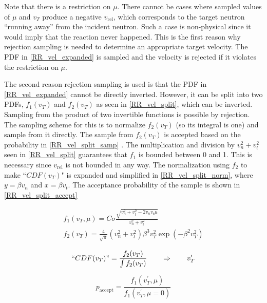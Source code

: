 Note that there is a restriction on $\mu$.  There cannot be cases where sampled values of $\mu$ and $v_T$ produce a negative $v_\mathrm{rel}$, which corresponds to the target neutron ``running away'' from the incident neutron.  Such a case is non-physical since it would imply that the reaction never happened.  This is the first reason why rejection sampling is needed to determine an appropriate target velocity.  The PDF in \eqref{RR_vel_expanded} is sampled and the velocity is rejected if it violates the restriction on $\mu$. %

The second reason rejection sampling is used is that the PDF in \eqref{RR_vel_expanded} cannot be directly inverted.  However, it can be split into two PDFs, $f_1(v_T)$ and $f_2(v_T)$ as seen in \eqref{RR_vel_split}, which can be inverted.  Sampling from the product of two invertible functions is possible by rejection.  The sampling scheme for this is to normalize $f_2(v_T)$ (so its integral is one) and sample from it directly.  The sample from $f_2(v_T)$ is accepted based on the probability in \eqref{RR_vel_split_samp} \cite{openmc}.
The multiplication and division by $v_n^2+v_t^2$ seen in \eqref{RR_vel_split} guarantees that $f_1$ is bounded between 0 and 1.  This is necessary since $v_\mathrm{rel}$ is not bounded in any way.  The normalization using $f_2$ to make ``$CDF(v_T)$" is expanded and simplified in \eqref{RR_vel_split_norm}, where $y=\beta v_n$ and $x=\beta v_t$.  The acceptance probability of the sample is shown in \eqref{RR_vel_split_accept}

\begin{equation}
\label{RR_vel_split}
\begin{gathered}
f_1(v_T,\mu) = C \sigma  \frac{\sqrt{v_n^2+v_t^2-2 v_n v_t \mu}}{v_n^2+v_t^2}\\
f_2(v_T) =  \frac{4}{\sqrt{\pi}} (v_n^2+v_t^2) \beta^3 v_T^2  \exp ( -\beta^2  v_T^2 )
\end{gathered}
\end{equation}

\begin{equation}
\label{RR_vel_split_samp}
``CDF(v_T)" = \frac{f_2(v_T)}{\int f_2(v_T)} \qquad \Rightarrow \qquad v_T^\prime 
\end{equation}

\begin{equation}
\label{RR_vel_split_accept}
p_\mathrm{accept} = \frac{f_1(v_T^\prime,\mu)}{ f_1(v_T^\prime,\mu=0)}
\end{equation}

